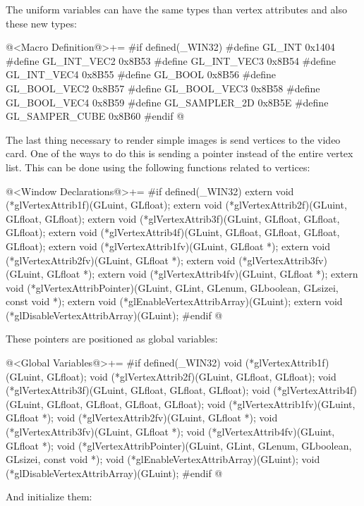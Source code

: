 The uniform variables can have the same types than vertex attributes
and also these new types:

\iniciocodigo
@<Macro Definition@>+=
#if defined(_WIN32)
#define GL_INT         0x1404
#define GL_INT_VEC2    0x8B53
#define GL_INT_VEC3    0x8B54
#define GL_INT_VEC4    0x8B55
#define GL_BOOL        0x8B56
#define GL_BOOL_VEC2   0x8B57
#define GL_BOOL_VEC3   0x8B58
#define GL_BOOL_VEC4   0x8B59
#define GL_SAMPLER_2D  0x8B5E
#define GL_SAMPER_CUBE 0x8B60
#endif
@
\fimcodigo

The last thing necessary to render simple images is send vertices to
the video card. One of the ways to do this is sending a pointer
instead of the entire vertex list. This can be done using the
following functions related to vertices:

\iniciocodigo
@<Window Declarations@>+=
#if defined(_WIN32)
extern void (*glVertexAttrib1f)(GLuint, GLfloat);
extern void (*glVertexAttrib2f)(GLuint, GLfloat, GLfloat);
extern void (*glVertexAttrib3f)(GLuint, GLfloat, GLfloat, GLfloat);
extern void (*glVertexAttrib4f)(GLuint, GLfloat, GLfloat, GLfloat, GLfloat);
extern void (*glVertexAttrib1fv)(GLuint, GLfloat *);
extern void (*glVertexAttrib2fv)(GLuint, GLfloat *);
extern void (*glVertexAttrib3fv)(GLuint, GLfloat *);
extern void (*glVertexAttrib4fv)(GLuint, GLfloat *);
extern void (*glVertexAttribPointer)(GLuint, GLint, GLenum, GLboolean,
                                     GLsizei, const void *);
extern void (*glEnableVertexAttribArray)(GLuint);
extern void (*glDisableVertexAttribArray)(GLuint);
#endif
@
\fimcodigo

These pointers are positioned as global variables:

\iniciocodigo
@<Global Variables@>+=
#if defined(_WIN32)
void (*glVertexAttrib1f)(GLuint, GLfloat);
void (*glVertexAttrib2f)(GLuint, GLfloat, GLfloat);
void (*glVertexAttrib3f)(GLuint, GLfloat, GLfloat, GLfloat);
void (*glVertexAttrib4f)(GLuint, GLfloat, GLfloat, GLfloat, GLfloat);
void (*glVertexAttrib1fv)(GLuint, GLfloat *);
void (*glVertexAttrib2fv)(GLuint, GLfloat *);
void (*glVertexAttrib3fv)(GLuint, GLfloat *);
void (*glVertexAttrib4fv)(GLuint, GLfloat *);
void (*glVertexAttribPointer)(GLuint, GLint, GLenum, GLboolean,
                              GLsizei, const void *);
void (*glEnableVertexAttribArray)(GLuint);
void (*glDisableVertexAttribArray)(GLuint);
#endif
@
\fimcodigo

And initialize them:

